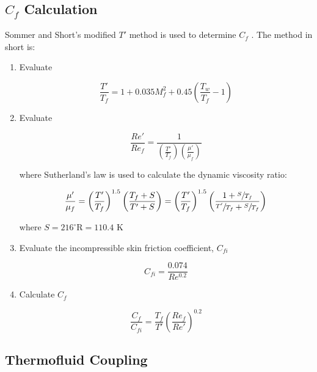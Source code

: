 \documentclass{article}
\begin{document}
\subsection{$C_f$ Calculation}

Sommer and Short's modified $T'$ method is used to determine $C_f$ \cite{Sommer1955}. The method in short is:

\begin{enumerate}
\item Evaluate

\begin{equation}
\frac{T'}{T_f} = 1 + 0.035 M_f^2 + 0.45 \left( \frac{T_w}{T_f} - 1 \right)
\end{equation}

\item Evaluate

\begin{equation}
\frac{Re'}{Re_f} = \frac{1}{\left(\frac{T'}{T_f}\right) \left(\frac{\mu'}{\mu_f}\right)}
\end{equation}

where Sutherland's law is used to calculate the dynamic viscosity ratio:

\begin{equation}
\frac{\mu'}{\mu_f} = \left(\frac{T'}{T_f}\right)^{1.5} \left( \frac{T_f + S}{T' + S} \right) = \left(\frac{T'}{T_f}\right)^{1.5} \left( \frac{1 + \sfrac{S}{T_f}}{\sfrac{T'}{T_f} + \sfrac{S}{T_f}} \right)
\end{equation}

where $S = 216 ^{\circ} \textrm{R} = 110.4 \textrm{ K}$

\item Evaluate the incompressible skin friction coefficient, $C_{fi}$

\begin{equation}
C_{fi} = \frac{0.074}{Re^{0.2}}
\end{equation}

\item Calculate $C_f$

\begin{equation}
\frac{C_f}{C_{fi}} = \frac{T_f}{T'} \left( \frac{Re_f}{Re'} \right)^{0.2}
\end{equation}

\end{enumerate}

\subsection{Thermofluid Coupling}
\end{document}
